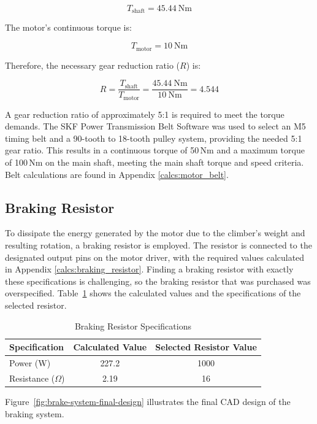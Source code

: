 \[
T_{\text{shaft}} = 45.44\ \text{Nm}
\]

The motor's continuous torque is:

\[
T_{\text{motor}} = 10\ \text{Nm}
\]

Therefore, the necessary gear reduction ratio (\( R \)) is:

\[
R = \frac{T_{\text{shaft}}}{T_{\text{motor}}} = \frac{45.44\ \text{Nm}}{10\ \text{Nm}} = 4.544
\]

A gear reduction ratio of approximately 5:1 is required to meet the torque demands. The SKF Power Transmission Belt Software \cite{SKF_BeltDriveTool} was used to select an M5 timing belt and a 90-tooth to 18-tooth pulley system, providing the needed 5:1 gear ratio. This results in a continuous torque of 50\,Nm and a maximum torque of 100\,Nm on the main shaft, meeting the main shaft torque and speed criteria. Belt calculations are found in Appendix \ref{calcs:motor_belt}.

\subsection{Braking Resistor}

To dissipate the energy generated by the motor due to the climber's weight and resulting rotation, a braking resistor is employed. The resistor is connected to the designated output pins on the motor driver, with the required values calculated in Appendix \ref{calcs:braking_resistor}. Finding a braking resistor with exactly these specifications is challenging, so the braking resistor that was purchased was overspecified. Table~\ref{tab:braking-resistor-specs} shows the calculated values and the specifications of the selected resistor.

\begin{table}[H]
    \centering
    \begin{tabular}{|l|c|c|}
        \hline
        \textbf{Specification} & \textbf{Calculated Value} & \textbf{Selected Resistor Value} \\
        \hline
        Power (W) & 227.2 & 1000 \\
        \hline
        Resistance ($\Omega$) & 2.19 & 16 \\
        \hline
    \end{tabular}
    \caption{Braking Resistor Specifications}
    \label{tab:braking-resistor-specs}
\end{table}

Figure~\ref{fig:brake-system-final-design} illustrates the final CAD design of the braking system.

